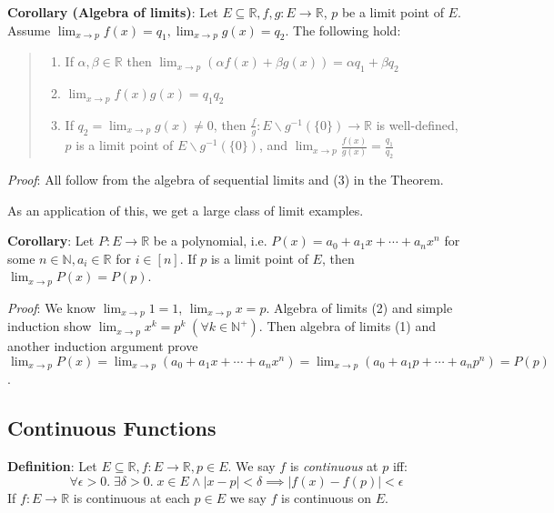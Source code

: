 \documentclass[11pt]{article}
\begin{document}
\textbf{Corollary (Algebra of limits)}: Let $E \subseteq \mathbb{R}, f,g : E \to \mathbb{R}$, $p$ be a limit point of $E$. Assume $\lim_{x \to p} f(x) = q_1, \lim_{x \to p} g(x) = q_2$. The following hold:
\begin{quote}\vspace{-0.3cm}
	\begin{enumerate}
	\item If $\alpha, \beta \in \mathbb{R}$ then $\lim_{x \to p} (\alpha f(x) + \beta g(x)) = \alpha q_1 + \beta q_2$
	\item $\lim_{x \to p} f(x)g(x) = q_1 q_2$
	\item If $q_2 = \lim_{x \to p} g(x) \neq 0$, then $\frac{f}{g} : E \backslash g^{-1}(\{0\}) \to \mathbb{R}$ is well-defined, $p$ is a limit point of $E \backslash g^{-1}(\{0\})$, and $\lim_{x \to p} \frac{f(x)}{g(x)} = \frac{q_1}{q_2}$
	\end{enumerate}
\end{quote}
\emph{Proof}: All follow from the algebra of sequential limits and (3) in the Theorem.

As an application of this, we get a large class of limit examples.

\textbf{Corollary}: Let $P : E \to \mathbb{R}$ be a polynomial, i.e. $P(x) = a_0 + a_1x + \cdots + a_nx^n$ for some $n \in \mathbb{N}, a_i \in \mathbb{R}$ for $i \in [n]$. If $p$ is a limit point of $E$, then $\lim_{x \to p} P(x) = P(p)$.

\emph{Proof}: We know $\lim_{x \to p} 1 = 1$, $\lim_{x \to p} x = p$. Algebra of limits (2) and simple induction show $\lim_{x \to p} x^k = p^k \;(\forall k \in \mathbb{N}^+)$. Then algebra of limits (1) and another induction argument prove $\lim_{x \to p} P(x) = \lim_{x \to p} (a_0 + a_1x + \cdots + a_nx^n) = \lim_{x \to p} (a_0 + a_1p + \cdots + a_n p^n) = P(p)$.

\subsection{Continuous Functions}

\textbf{Definition}: Let $E \subseteq \mathbb{R}, f : E \to \mathbb{R}, p \in E$. We say $f$ is \emph{continuous} at $p$ iff:
\begin{displaymath}
\forall \epsilon > 0.\; \exists \delta > 0.\; x \in E \land |x-p| < \delta \implies |f(x) - f(p)| < \epsilon
\end{displaymath}
If $f : E \to \mathbb{R}$ is continuous at each $p \in E$ we say $f$ is continuous on $E$.
\end{document}
